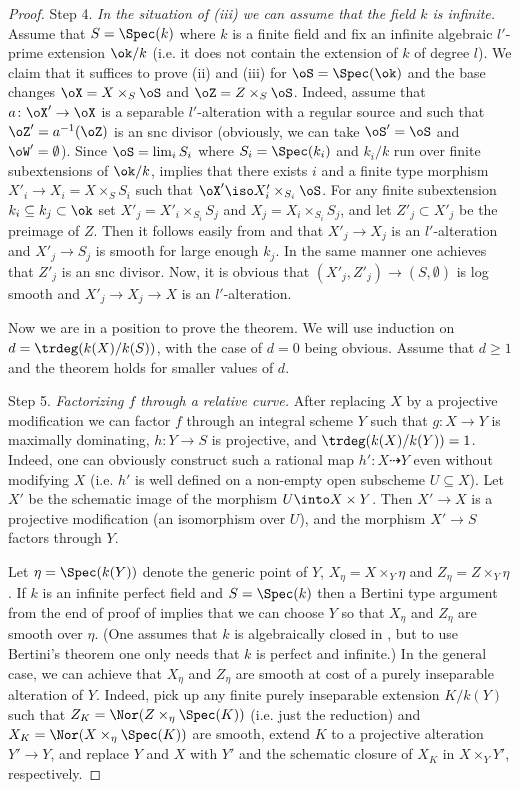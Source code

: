 \documentclass[10pt]{../fichiers-configuration-latex/smfart}
\begin{document}
\begin{proof}
Step 4. {\it In the situation of (iii) we can assume that the field $k$ is infinite.} Assume that
$S=\Spec(k)$ where $k$ is a finite field and fix an infinite algebraic $l'$-prime extension $\ok/k$
(i.e. it does not contain the extension of $k$ of degree $l$). We claim that it suffices to prove
(ii) and (iii) for $\oS=\Spec(\ok)$ and the base changes $\oX=X\times_S\oS$ and $\oZ=Z\times_S\oS$.
Indeed, assume that $a{\colon}\oX'\to\oX$ is a separable $l'$-alteration with a regular source and
such that $\oZ'=a^{-1}(\oZ)$ is an snc divisor (obviously, we can take $\oS'=\oS$ and $\oW'=\emptyset$).
Since $\oS=\lim_i S_i$ where $S_i=\Spec(k_i)$ and $k_i/k$ run over finite subextensions of $\ok/k$,
\cite[8.8.2(ii)]{EGAIV-3} implies that there exists $i$ and a finite type morphism
$X'_i\to X_i=X\times_SS_i$ such that $\oX'\iso X'_i\times_{S_i}\oS$. For any finite
subextension $k_i\subseteq k_j\subset\ok$ set $X'_j=X'_i\times_{S_i}S_j$ and $X_j=X_i\times_{S_i}S_j$,
and let $Z'_j\subset X'_j$ be the preimage of $Z$. Then it follows easily from \cite[8.10.5]{EGAIV-3}
and \cite[17.7.8]{EGAIV-4} that $X'_j\to X_j$ is an $l'$-alteration and $X'_j\to S_j$ is smooth for
large enough $k_j$. In the same manner one achieves that $Z'_j$ is an snc divisor. Now, it is obvious
that $(X'_j,Z'_j)\to(S,\emptyset)$ is log smooth and $X'_j\to X_j\to X$ is an $l'$-alteration.

Now we are in a position to prove the theorem. We will use induction on $d=\trdeg(k(X)/k(S))$, with
the case of $d=0$ being obvious. Assume that $d\ge 1$ and the theorem holds for smaller values of $d$.

Step 5. {\it Factorizing $f$ through a relative curve.} After replacing $X$ by a projective modification
we can factor $f$ through an integral scheme $Y$ such that $g{\colon}X\to Y$ is maximally dominating,
$h{\colon}Y\to S$ is projective, and $\trdeg(k(X)/k(Y))=1$. Indeed, one can obviously construct such
a rational map $h'{\colon}X\dasharrow Y$ even without modifying $X$ (i.e. $h'$ is well defined on a
non-empty open subscheme $U\subseteq X$). Let $X'$ be the schematic image of the morphism $U\into X\times Y$.
Then $X'\to X$ is a projective modification (an isomorphism over $U$), and the morphism $X'\to S$
factors through $Y$.

Let $\eta=\Spec(k(Y))$ denote the generic point of $Y$, $X_\eta=X\times_{Y}\eta$ and
$Z_\eta=Z\times_Y\eta$. If $k$ is an infinite perfect field and $S=\Spec(k)$ then
a Bertini type argument from the end of proof of \cite[4.11]{Alterations@de_Jong}
implies that we can choose $Y$ so that $X_\eta$ and $Z_\eta$ are smooth over $\eta$.
(One assumes that $k$ is algebraically closed in \cite{Alterations@de_Jong}, but to
use Bertini's theorem one only needs that $k$ is perfect and infinite.) In the general
case, we can achieve that $X_\eta$ and $Z_\eta$ are smooth at cost of a purely inseparable
alteration of $Y$. Indeed, pick up any finite purely inseparable extension $K/k(Y)$ such
that $Z_K=\Nor(Z\times_\eta\Spec(K))$ (i.e. just the reduction) and $X_K=\Nor(X\times_\eta\Spec(K))$
are smooth, extend $K$ to a projective alteration $Y'\to Y$, and replace $Y$ and $X$ with $Y'$
and the schematic closure of $X_K$ in $X\times_YY'$, respectively.


\end{proof}
\end{document}
